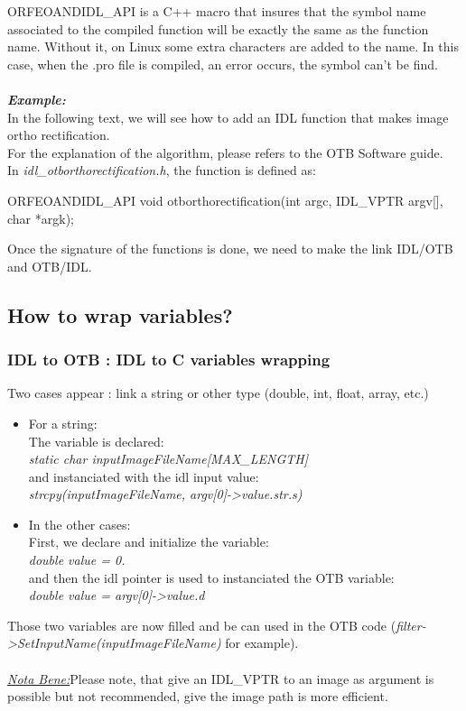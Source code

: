 ORFEOANDIDL\_API is a C++ macro that insures that the symbol name associated to the compiled function will be exactly the same as the function name. Without it, 
on Linux some extra characters are added to the name. In this case, when the .pro file is compiled, an error occurs, the symbol can't be find.
 \\
\\
\emph{\textbf{Example:}}\\
\indent In the following text, we will see how to add an IDL function that makes image ortho rectification.\\
\indent For the explanation of the algorithm, please refers to the OTB Software guide.\\
\indent In \emph{idl\_otborthorectification.h}, the function is defined as:\\
\begin{scriptsize}
\indent ORFEOANDIDL\_API void otborthorectification(int argc, IDL\_VPTR argv[], char *argk);\\
\end{scriptsize}

Once the signature of the functions is done, we need to make the link IDL/OTB and OTB/IDL.

\subsection{How to wrap variables?}
\subsubsection{IDL to OTB : IDL to C variables wrapping}
Two cases appear : link a string or other type (double, int, float, array, etc.)

\begin{itemize}
\item For a string:\\
  The variable is declared:\\ 
  \emph{static char inputImageFileName[MAX\_LENGTH]}\\
  and instanciated with the idl input value:\\ \emph{strcpy(inputImageFileName, argv[0]->value.str.s)}\\
\item In the other cases:\\
  First, we declare and initialize the variable:\\ \emph{double value = 0.}\\
  and then the idl pointer is used to instanciated the OTB variable:\\ \emph{double value = argv[0]->value.d}\\
\end{itemize}
Those two variables are now filled and be can used in the OTB code (\emph{filter->SetInputName(inputImageFileName)} for example).
\\
\\
\emph{\underline{Nota Bene:}}Please note, that give an IDL\_VPTR to an image as argument is possible but not recommended, give the image path is more efficient.

